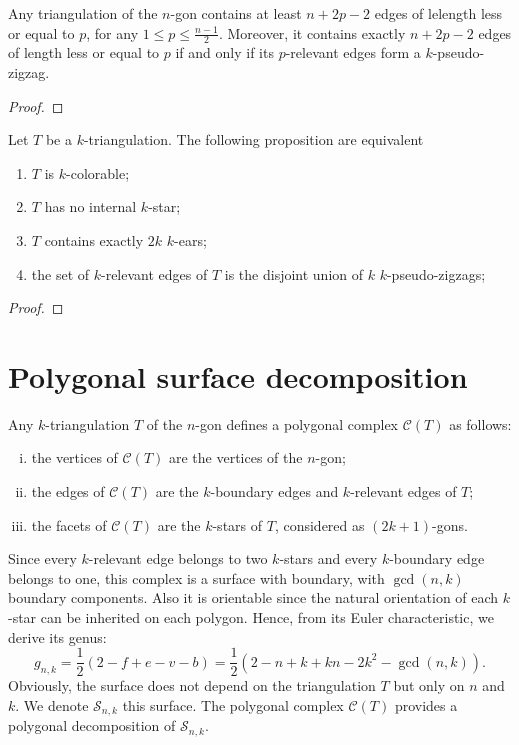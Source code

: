 \documentclass[12pt]{amsart}
\begin{document}
\begin{lemma}
Any triangulation of the $n$-gon contains at least $n+2p-2$ edges of lelength less or equal to $p$, for any $1\le p\le \frac{n-1}{2}$. Moreover, it contains exactly $n+2p-2$ edges of length less or equal to $p$ if and only if its $p$-relevant edges form a $k$-pseudo-zigzag.
\end{lemma}

\begin{proof}

\end{proof}


\begin{corollary}
Let $T$ be a $k$-triangulation. The following proposition are equivalent
\begin{enumerate}
\item $T$ is $k$-colorable;
\item $T$ has no internal $k$-star;
\item $T$ contains exactly $2k$ $k$-ears;
\item the set of $k$-relevant edges of $T$ is the disjoint union of $k$ $k$-pseudo-zigzags;
\end{enumerate}
\end{corollary}

\begin{proof}

\end{proof}



\section{Polygonal surface decomposition}\label{sectionsurfaces}

Any $k$-triangulation $T$ of the $n$-gon defines a polygonal complex $\mathcal{C}(T)$ as follows:
\begin{enumerate}[(i)]
\item the vertices of $\mathcal{C}(T)$ are the vertices of the $n$-gon;
\item the edges of $\mathcal{C}(T)$ are the $k$-boundary edges and $k$-relevant edges of $T$;
\item the facets of $\mathcal{C}(T)$ are the $k$-stars of $T$, considered as $(2k+1)$-gons.
\end{enumerate}
Since every $k$-relevant edge belongs to two $k$-stars and every $k$-boundary edge belongs to one, this complex is a surface with boundary, with $\gcd(n,k)$ boundary components. Also it is orientable since the natural orientation of each $k$-star can be inherited on each polygon. Hence, from its Euler characteristic, we derive its genus:
$$g_{n,k}=\frac{1}{2}(2-f+e-v-b)=\frac{1}{2}(2-n+k+kn-2k^2-\gcd(n,k)).$$
Obviously, the surface does not depend on the triangulation $T$ but only on $n$ and $k$. We denote $\mathcal{S}_{n,k}$ this surface. The polygonal complex $\mathcal{C}(T)$ provides a polygonal decomposition of $\mathcal{S}_{n,k}$.
\end{document}
